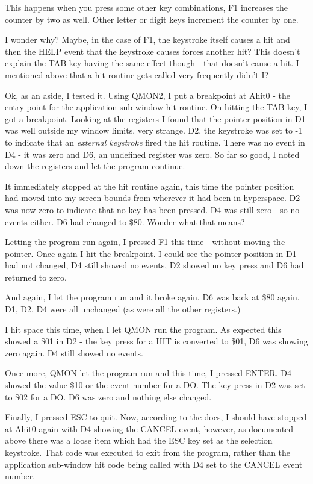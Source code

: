 This happens when you press some other key combinations, F1 increases the
        counter by two as well. Other letter or digit keys increment the counter by
        one.

I wonder why? Maybe, in the case of F1, the keystroke itself causes a hit
        and then the HELP event that the keystroke causes forces another hit? This doesn't
        explain the TAB key having the same effect though -{} that doesn't cause a hit. I
        mentioned above that a hit routine gets called very frequently didn't I?

\begin{note}
Ok, as an aside, I tested it. Using QMON2, I
            put a breakpoint at Ahit0 -{} the entry point for the application sub-{}window hit
            routine. On hitting the TAB key, I got a breakpoint. Looking at the registers
            I found that the pointer position in D1 was well outside my window limits,
            very strange. D2, the keystroke was set to -{}1 to indicate that an
 \emph{external keystroke} fired the hit routine. There was no
            event in D4 -{} it was zero and D6, an undefined register was zero. So far so
            good, I noted down the registers and let the program continue.

It immediately stopped at the hit routine again, this time the pointer
            position had moved into my screen bounds from wherever it had been in
            hyperspace. D2 was now zero to indicate that no key has been pressed. D4 was
            still zero -{} so no events either. D6 had changed to \$80. Wonder what that
            means?

Letting the program run again, I pressed F1 this time -{} without moving
            the pointer. Once again I hit the breakpoint. I could see the pointer position
            in D1 had not changed, D4 still showed no events, D2 showed no key press and
            D6 had returned to zero.

And again, I let the program run and it broke again. D6 was back at \$80
            again. D1, D2, D4 were all unchanged (as were all the other registers.)

I hit space this time, when I let QMON run
            the program. As expected this showed a \$01 in D2 -{} the key press for a HIT is
            converted to \$01, D6 was showing zero again. D4 still showed no events.

Once more, QMON let the program run and this
            time, I pressed ENTER. D4 showed the value \$10 or the event number for a DO.
            The key press in D2 was set to \$02 for a DO. D6 was zero and nothing else
            changed.

Finally, I pressed ESC to quit. Now, according to the docs, I should
            have stopped at Ahit0 again with D4 showing the CANCEL event, however, as
            documented above there was a loose item which had the ESC key set as the
            selection keystroke. That code was executed to exit from the program, rather
            than the application sub-{}window hit code being called with D4 set to the
            CANCEL event number.
\end{note}

